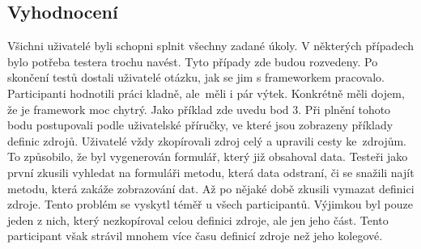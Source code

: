 \subsection{Vyhodnocení}
Všichni uživatelé byli schopni splnit všechny zadané úkoly. V některých případech bylo potřeba testera trochu navést. Tyto případy zde budou rozvedeny. Po skončení testů dostali uživatelé otázku, jak se jim s frameworkem pracovalo. Participanti hodnotili práci kladně, ale~měli i pár výtek. Konkrétně měli dojem, že je framework moc chytrý. Jako příklad zde uvedu bod 3. Při plnění tohoto bodu postupovali podle uživatelské příručky, ve které jsou zobrazeny příklady definic zdrojů. Uživatelé vždy zkopírovali zdroj celý a upravili cesty ke~zdrojům. To způsobilo, že byl vygenerován formulář, který již obsahoval data. Testeři jako první zkusili vyhledat na formuláři metodu, která data odstraní, či se snažili najít metodu, která zakáže zobrazování dat. Až po nějaké době zkusili vymazat definici zdroje. Tento problém se vyskytl téměř u všech participantů. Výjimkou byl pouze jeden z nich, který nezkopíroval celou definici zdroje, ale jen jeho část. Tento participant však strávil mnohem více času definicí zdroje než jeho kolegové.

